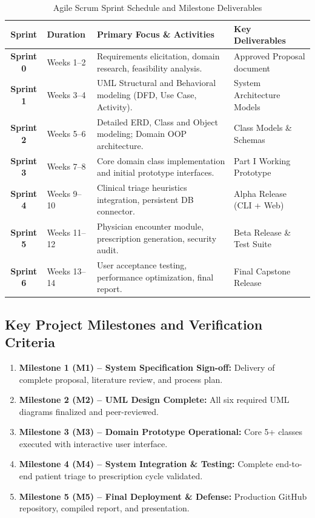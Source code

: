 \documentclass[11pt,a4paper]{article}
\begin{document}
\begin{table}[H]
\centering
\caption{Agile Scrum Sprint Schedule and Milestone Deliverables}
\label{tab:sprint_breakdown}
\small
\begin{tabularx}{\textwidth}{clXp{3.2cm}}
\toprule
\textbf{Sprint} & \textbf{Duration} & \textbf{Primary Focus \& Activities} & \textbf{Key Deliverables} \\
\midrule
\textbf{Sprint 0} & Weeks 1--2 & Requirements elicitation, domain research, feasibility analysis. & Approved Proposal document \\
\textbf{Sprint 1} & Weeks 3--4 & UML Structural and Behavioral modeling (DFD, Use Case, Activity). & System Architecture Models \\
\textbf{Sprint 2} & Weeks 5--6 & Detailed ERD, Class and Object modeling; Domain OOP architecture. & Class Models \& Schemas \\
\textbf{Sprint 3} & Weeks 7--8 & Core domain class implementation and initial prototype interfaces. & Part I Working Prototype \\
\textbf{Sprint 4} & Weeks 9--10 & Clinical triage heuristics integration, persistent DB connector. & Alpha Release (CLI + Web) \\
\textbf{Sprint 5} & Weeks 11--12 & Physician encounter module, prescription generation, security audit. & Beta Release \& Test Suite \\
\textbf{Sprint 6} & Weeks 13--14 & User acceptance testing, performance optimization, final report. & Final Capstone Release \\
\bottomrule
\end{tabularx}
\end{table}

\subsection{Key Project Milestones and Verification Criteria}
\begin{enumerate}
    \item \textbf{Milestone 1 (M1) -- System Specification Sign-off:} Delivery of complete proposal, literature review, and process plan.
    \item \textbf{Milestone 2 (M2) -- UML Design Complete:} All six required UML diagrams finalized and peer-reviewed.
    \item \textbf{Milestone 3 (M3) -- Domain Prototype Operational:} Core 5+ classes executed with interactive user interface.
    \item \textbf{Milestone 4 (M4) -- System Integration \& Testing:} Complete end-to-end patient triage to prescription cycle validated.
    \item \textbf{Milestone 5 (M5) -- Final Deployment \& Defense:} Production GitHub repository, compiled report, and presentation.
\end{enumerate}
\end{document}

